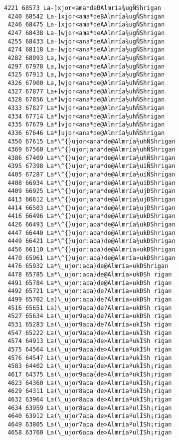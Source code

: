 \documentclass[11pt]{article}
\begin{document}
\begin{Verbatim}[commandchars=\\\{\}]
 4221 68573 La-]xjor<ama*deBAlmría¾ugÑShrigan
 4240 68542 La-]xjor<ama*deBAlmría¾ugÑShrigan
 4246 68475 La-]xjor<ama*deAAlmría¾ugÑShrigan
 4247 68438 La-]wjor<ama*deAAlmría¾ugÑShrigan
 4255 68433 La-]wjor<ana*deAAlmría¾ugÑShrigan
 4274 68118 La-]wjor<ana*deAAlmría½ugÑShrigan
 4282 68093 La,]wjor<ana*deAAlmría½ugÑShrigan
 4297 67978 La,]wjor<ana*deAAlmría½ugÑShrigan
 4325 67913 La,]wjor<ana*de@Almría½ugÑShrigan
 4326 67900 La,]wjor<ana*de@Almría½uhÑShrigan
 4327 67877 La+]wjor<ana*de@Almría½uhÑShrigan
 4328 67856 La*]wjor<ana*de@Almría½uhÑShrigan
 4333 67827 La*]wjor<ana*de@Almría½uhÑShrigan
 4334 67714 La*]wjor<ana*de@Almría½uhÑShrigan
 4335 67679 La*]vjor<ana*de@Almría½uhÑShrigan
 4336 67646 La*]ujor<ana*de@Almría½uhÑShrigan
 4350 67615 La*\^{}ujor<ana*de@Almría½uhÑShrigan
 4369 67560 La*\^{}ujor;ana*de@Almría½uhÑShrigan
 4386 67409 La*\^{}ujor;ana*de@Almría½uhÑShrigan
 4395 67398 La*\^{}ujor;ana*de@Almría½uiÑShrigan
 4405 67287 La*\^{}ujor;ana*de@Almría½uiÑShrigan
 4408 66934 La*\^{}ujor;ana*de@Almría½uiÐShrigan
 4409 66925 La*\^{}ujor;ana*de@Almría½ujÐShrigan
 4413 66612 La*\^{}ujor;ana*de@Almría¼ujÐShrigan
 4414 66503 La*\^{}ujor;ana*de@Almría¼ujÐShrigan
 4416 66496 La*\^{}ujor;ana*de@Almría¼ukÐShrigan
 4426 66493 La*\^{}ujor;aoa*de@Almría¼ukÐShrigan
 4447 66440 La*\^{}ujor:aoa*de@Almría¼ukÐShrigan
 4449 66421 La*\^{}ujor:aoa)de@Almría¼ukÐShrigan
 4456 66110 La*\^{}ujor:aoa)de@Almría»ukÐShrigan
 4470 65961 La*\^{}ujor:aoa)de@Almría»ukÐShrigan
 4476 65932 La*\_ujor:aoa)de@Almría»ukÐShrigan
 4478 65785 La*\_ujor:aoa)de@Almría»ukÐSh rigan
 4491 65784 La*\_ujor:apa)de@Almría»ukÐSh rigan
 4492 65721 La*\_ujor:apa)de?Almría»ukÐSh rigan
 4499 65702 La)\_ujor:apa)de?Almría»ukÐSh rigan
 4516 65651 La)\_ujor9apa)de?Almría»ukÐSh rigan
 4527 65634 La(\_ujor9apa)de?Almría»ukÐSh rigan
 4531 65283 La(\_ujor9apa)de?Almría»ukÏSh rigan
 4547 65222 La(\_ujor9apa)de>Almría»ukÏSh rigan
 4574 64913 La(\_ujor9apa)de>AlmríaºukÏSh rigan
 4575 64564 La(\_ujor9apa)de>AlmríaºukÎSh rigan
 4576 64547 La(\_ujor9apa(de>AlmríaºukÎSh rigan
 4583 64402 La(\_ujor9apa(de>AlmríaºukÎSh¡rigan
 4617 64375 La(\_ujor9apa(de>AlmríaºukÎSh¡rigan
 4623 64360 La(\_ujor9apa'de>AlmríaºukÎSh¡rigan
 4629 64311 La(\_ujor8apa'de>AlmríaºukÎSh¡rigan
 4632 63964 La(\_ujor8apa'de>AlmríaºukÍSh¡rigan
 4634 63959 La(\_ujor8apa'de>AlmríaºulÍSh¡rigan
 4640 63912 La(\_ujor7apa'de>AlmríaºulÍSh¡rigan
 4649 63805 La(\_ujor7apa'de>AlmríaºulÍSh¡rigan
 4658 63760 La(\_ujor6apa'de>AlmríaºulÍSh¡rigan

\end{Verbatim}
\end{document}
